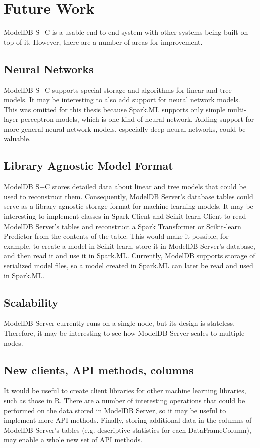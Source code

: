 \chapter{Future Work}
ModelDB S+C is a usable end-to-end system with other systems being built on top of it.
However, there are a number of areas for improvement.

\section{Neural Networks}
ModelDB S+C supports special storage and algorithms for linear and tree models. It
may be interesting to also add support for neural network models. This was omitted 
for this thesis because Spark.ML supports only simple multi-layer perceptron models,
which is one kind of neural network. Adding support for more general neural network models,
especially deep neural networks, could be valuable.

\section{Library Agnostic Model Format}
ModelDB S+C stores detailed data about linear and tree models that could be used
to reconstruct them. Consequently, ModelDB Server's database tables could serve as a library agnostic
storage format for machine learning models. It may be interesting to implement classes in
Spark Client and Scikit-learn Client to read ModelDB Server's tables and reconstruct a Spark Transformer or Scikit-learn
Predictor from the contents of the table. This would make it possible, for example, to create a model in Scikit-learn,
store it in ModelDB Server's database, and then read it and use it in Spark.ML. Currently, ModelDB supports
storage of serialized model files, so a model created in Spark.ML can later be read and used in Spark.ML.

\section{Scalability}
ModelDB Server currently runs on a single node, but its design is stateless. Therefore,
it may be interesting to see how ModelDB Server scales to multiple nodes.

\section{New clients, API methods, columns}
It would be useful to create client libraries for other machine learning libraries,
such as those in R. There are a number of interesting operations that could be performed
on the data stored in ModelDB Server, so it may be useful to implement more API methods. Finally,
storing additional data in the columns of ModelDB Server's tables (e.g. descriptive statistics for each DataFrameColumn),
may enable a whole new set of API methods.
